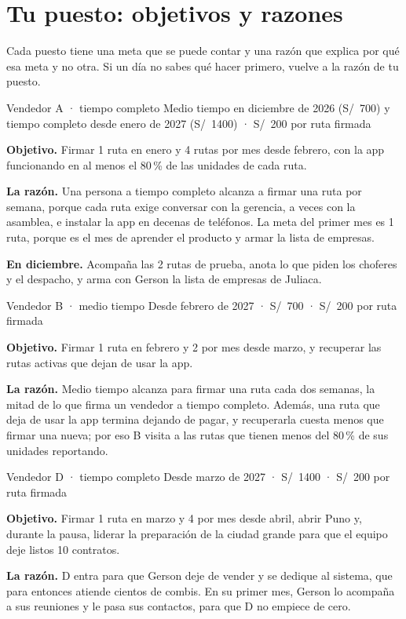 \documentclass[a4paper]{article}
\begin{document}
\section{Tu puesto: objetivos y razones}

Cada puesto tiene una meta que se puede contar y una razón que explica por qué esa meta y no otra. Si un día no sabes qué hacer primero, vuelve a la razón de tu puesto.

\begin{rol}{Vendedor A · tiempo completo}
{\small\color{tenue}Medio tiempo en diciembre de 2026 (S/~700) y tiempo completo desde enero de 2027 (S/~1400) · S/~200 por ruta firmada}\par\vspace{4pt}
\textbf{Objetivo.} Firmar 1 ruta en enero y 4 rutas por mes desde febrero, con la app funcionando en al menos el 80\,\% de las unidades de cada ruta.

\textbf{La razón.} Una persona a tiempo completo alcanza a firmar una ruta por semana, porque cada ruta exige conversar con la gerencia, a veces con la asamblea, e instalar la app en decenas de teléfonos. La meta del primer mes es 1 ruta, porque es el mes de aprender el producto y armar la lista de empresas.

\textbf{En diciembre.} Acompaña las 2 rutas de prueba, anota lo que piden los choferes y el despacho, y arma con Gerson la lista de empresas de Juliaca.
\end{rol}

\begin{rol}{Vendedor B · medio tiempo}
{\small\color{tenue}Desde febrero de 2027 · S/~700 · S/~200 por ruta firmada}\par\vspace{4pt}
\textbf{Objetivo.} Firmar 1 ruta en febrero y 2 por mes desde marzo, y recuperar las rutas activas que dejan de usar la app.

\textbf{La razón.} Medio tiempo alcanza para firmar una ruta cada dos semanas, la mitad de lo que firma un vendedor a tiempo completo. Además, una ruta que deja de usar la app termina dejando de pagar, y recuperarla cuesta menos que firmar una nueva; por eso B visita a las rutas que tienen menos del 80\,\% de sus unidades reportando.
\end{rol}

\begin{rol}{Vendedor D · tiempo completo}
{\small\color{tenue}Desde marzo de 2027 · S/~1400 · S/~200 por ruta firmada}\par\vspace{4pt}
\textbf{Objetivo.} Firmar 1 ruta en marzo y 4 por mes desde abril, abrir Puno y, durante la pausa, liderar la preparación de la ciudad grande para que el equipo deje listos 10 contratos.

\textbf{La razón.} D entra para que Gerson deje de vender y se dedique al sistema, que para entonces atiende cientos de combis. En su primer mes, Gerson lo acompaña a sus reuniones y le pasa sus contactos, para que D no empiece de cero.
\end{rol}
\end{document}
